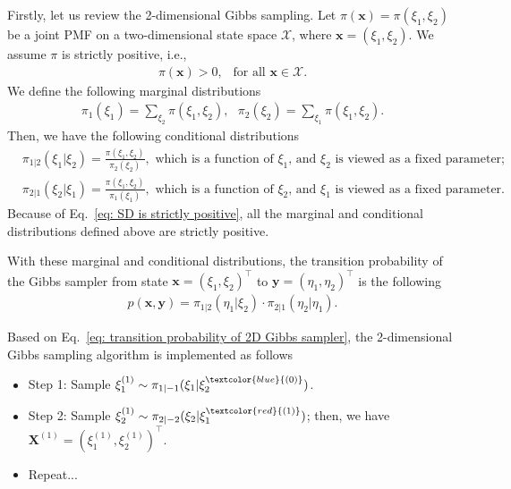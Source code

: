 \documentclass[11pt,letterpaper, leqno]{article}
\numberwithin{equation}{section}
\numberwithin{theorem}{section}
\numberwithin{lemma}{section}
\numberwithin{corollary}{section}
\numberwithin{definition}{section}
\numberwithin{proposition}{section}
\numberwithin{remark}{section}
\numberwithin{example}{section}
\newcommand{\T}{\intercal}
\begin{document}
Firstly, let us review the 2-dimensional Gibbs sampling. Let $\pi(\boldsymbol{x})=\pi(\xi_1,\xi_2)$ be a joint PMF on a two-dimensional state space $\mathcal{X}$, where $\boldsymbol{x}=(\xi_1,\xi_2)$. We assume $\pi$ is strictly positive, i.e.,
\begin{align}\label{eq: SD is strictly positive}
    \pi(\boldsymbol{x})>0,\ \ \mbox{ for all }\boldsymbol{x}\in\mathcal{X}.
\end{align}
We define the following marginal distributions
\begin{align*}
    \pi_1(\xi_1)=\sum_{\xi_2}\pi(\xi_1,\xi_2),\ \ \ \pi_2(\xi_2)=\sum_{\xi_1}\pi(\xi_1,\xi_2).
\end{align*}
Then, we have the following conditional distributions
\begin{align*}
    & \pi_{1\vert 2}(\xi_1\vert\xi_2)= \frac{\pi(\xi_1,\xi_2)}{\pi_2(\xi_2)}, \mbox{ which is a function of $\xi_1$, and $\xi_2$ is viewed as a fixed parameter}; \\
    & \pi_{2\vert 1}(\xi_2\vert\xi_1)= \frac{\pi(\xi_1,\xi_2)}{\pi_1(\xi_1)} , \mbox{ which is a function of $\xi_2$, and $\xi_1$ is viewed as a fixed parameter}.
\end{align*}
Because of Eq.~\eqref{eq: SD is strictly positive}, all the marginal and conditional distributions defined above are strictly positive. 

With these marginal and conditional distributions, the transition probability of the Gibbs sampler from state $\boldsymbol{x}=(\xi_1,\xi_2)^\T$ to $\boldsymbol{y}=(\eta_1,\eta_2)^\T$ is the following
\begin{align}\label{eq: transition probability of 2D Gibbs sampler}
    p(\boldsymbol{x}, \boldsymbol{y})= \pi_{1\vert2}(\eta_1\vert\xi_2)\cdot\pi_{2\vert1}(\eta_2\vert\eta_1).
\end{align}

Based on Eq.~\eqref{eq: transition probability of 2D Gibbs sampler}, the 2-dimensional Gibbs sampling algorithm is implemented as follows
\begin{itemize}
    \item Step 1: Sample $\xi_1^{(1)}\sim \pi_{1\vert-1}(\xi_1\vert \xi_2^{\textcolor{blue}{(0)}})$.
    \item Step 2: Sample $\xi_2^{(1)}\sim\pi_{2\vert-2}(\xi_2\vert\xi_1^{\textcolor{red}{(1)}})$; then, we have $\boldsymbol{X}^{(1)}=(\xi_1^{(1)}, \xi_2^{(1)})^\T$.
    \item Repeat...
\end{itemize}
\end{document}

